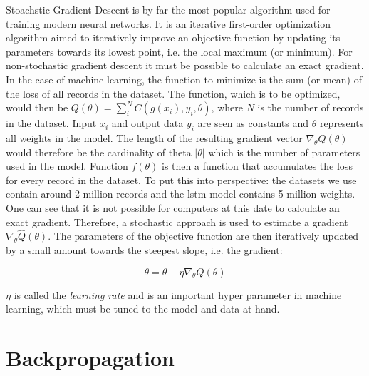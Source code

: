 Stoachstic Gradient Descent is by far the most popular algorithm used for training modern neural networks. 
It is an iterative first-order optimization algorithm aimed to iteratively improve an objective function by updating its parameters towards its lowest point, i.e. the local maximum (or minimum). For non-stochastic gradient descent it must be possible to calculate an exact gradient. In the case of machine learning, the function to minimize is the sum (or mean) of the loss of all records in the dataset. The function, which is to be optimized, would then be $Q(\theta) = \sum^N_i C(g(x_i),y_i,\theta)$, where $N$ is the number of records in the dataset. Input $x_i$ and output data $y_i$ are seen as constants and $\theta$ represents all weights in the model. The length of the resulting gradient vector $\nabla_\theta Q(\theta)$ would therefore be the cardinality of theta $|\theta|$ which is the number of parameters used in the model. Function $f(\theta)$ is then a function that accumulates the loss for every record in the dataset. To put this into perspective: the datasets we use contain around 2 million records and the \gls{lstm} model contains 5 million weights. One can see that it is not possible for computers at this date to calculate an exact gradient. Therefore, a stochastic approach is used to estimate a gradient $\nabla_\theta \hat{Q}(\theta)$. The parameters of the objective function are then iteratively updated by a small amount towards the steepest slope, i.e. the gradient:

\begin{equation}
\theta = \theta - \eta\nabla_\theta Q(\theta)
\end{equation}

$\eta$ is called the \textit{learning rate} and is an important hyper parameter in machine learning, which must be tuned to the model and data at hand.



\section{Backpropagation} \label{sec:background:backprop}

